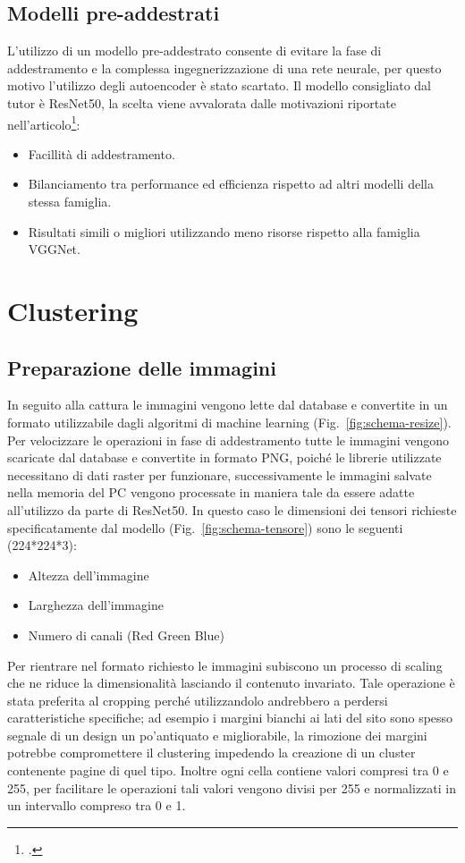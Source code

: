 \newpage

\subsection{Modelli pre-addestrati}
L'utilizzo di un modello pre-addestrato consente di evitare la fase di addestramento e la complessa ingegnerizzazione di una rete neurale, per questo motivo l'utilizzo degli autoencoder è stato scartato.
Il modello consigliato dal tutor è ResNet50, la scelta viene avvalorata dalle motivazioni riportate nell'articolo\footcite{site:why-resnet}:
\begin{itemize}
  \item Facillità di addestramento.
  \item Bilanciamento tra performance ed efficienza rispetto ad altri modelli della stessa famiglia.
  \item Risultati simili o migliori utilizzando meno risorse rispetto alla famiglia VGGNet. 
\end{itemize}

\section{Clustering}
\subsection{Preparazione delle immagini}
In seguito alla cattura le immagini vengono lette dal database e convertite in un formato utilizzabile dagli algoritmi di machine learning (Fig.~\ref{fig:schema-resize}).
Per velocizzare le operazioni in fase di addestramento tutte le immagini vengono scaricate dal database e convertite in formato PNG, poiché le librerie utilizzate necessitano di dati raster per funzionare, successivamente le immagini salvate nella memoria del PC vengono processate in maniera tale da essere adatte all'utilizzo da parte di ResNet50.
In questo caso le dimensioni dei tensori richieste specificatamente dal modello (Fig.~\ref{fig:schema-tensore}) sono le seguenti (224*224*3):
\begin{itemize}
  \item Altezza dell'immagine
  \item Larghezza dell'immagine 
  \item Numero di canali (Red Green Blue)
\end{itemize}
Per rientrare nel formato richiesto le immagini subiscono un processo di scaling che ne riduce la dimensionalità lasciando il contenuto invariato.
Tale operazione è stata preferita al cropping perché utilizzandolo andrebbero a perdersi caratteristiche specifiche; ad esempio i margini bianchi ai lati del sito sono spesso segnale di un design un po'antiquato e migliorabile,  
la rimozione dei margini potrebbe compromettere il clustering impedendo la creazione di un cluster contenente pagine di quel tipo.
Inoltre ogni cella contiene valori compresi tra 0 e 255, per facilitare le operazioni tali valori vengono divisi per 255 e normalizzati in un intervallo compreso tra 0 e 1.

